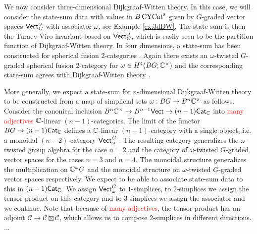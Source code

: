 We now consider three-dimensional Dijkgraaf-Witten theory.
In this case, we will consider the state-sum data with values in $B\operatorname{\mathrm{CYCat}^s}$ given by $G$-graded vector spaces $\mathsf{Vect}^\omega_G$ with associator $\omega$, see Example \ref{ex:3dDW}.
The state-sum is then the Turaev-Viro invariant based on $\mathsf{Vect}^\omega_G$, which is easily seen to be the partition function of Dijkgraaf-Witten theory. 
In four dimensions, a state-sum has been constructed for spherical fusion $2$-categories \cite{douglasreutter}. 
Again there exists an $\omega$-twisted $G$-graded spherical fusion $2$-category for $\omega \in H^4(BG; \mathbb{C}^\times)$ and the corresponding state-sum agrees with Dijkgraaf-Witten theory \cite[3.4.2.]{douglasreutter}.

More generally, we expect a state-sum for $n$-dimensional Dijkgraaf-Witten theory to be constructed from a map of simplicial sets $\omega: BG \to B^n \mathbb{C}^\times$ as follows.
Consider the canonical inclusion $B^n \mathbb{C}^\times \to B^{n-1} \mathsf{Vect} \to (n-1)\mathsf{Cat}_{\mathbb{C}}$ into \textcolor{red}{many adjectives} $\mathbb{C}$-linear $(n-1)$-categories. 
 The limit of the functor $BG \to (n-1)\mathsf{Cat}_{\mathbb{C}}$ defines a $\mathbb{C}$-linear $(n-1)$-category with a single object, i.e. a monoidal $(n-2)$-category $\mathsf{Vect}^G_\omega$ .
 The resulting category generalizes the $\omega$-twisted group algebra for the case $n = 2$ and the category of $\omega$-twisted $G$-graded vector spaces for the cases $n = 3$ and $n=4$.
 The monoidal structure generalizes the multiplication on $\mathbb{C}^\omega G$ and the monoidal structure on $\omega$-twisted $G$-graded vector spaces respectively.
 We expect to be able to associate state-sum data to this in $(n-1)\mathsf{Cat}_{\mathbb{C}}$.
We assign $\mathsf{Vect}^G_\omega$ to $1$-simplices, to $2$-simplices we assign the tensor product on this category and to $3$-simplices we assign the associator and we continue. 
Note that because of \textcolor{red}{many adjectives}, the tensor product has an adjoint $\mathcal{C} \to \mathcal{C} \boxtimes \mathcal{C}$, which allows us to compose $2$-simplices in different directions.
...

